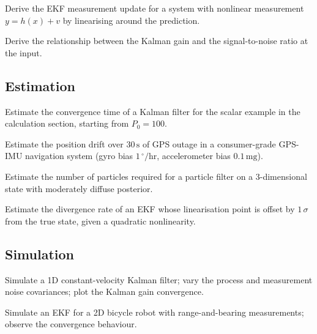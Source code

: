 \begin{exercise}
Derive the EKF measurement update for a system with nonlinear measurement $y = h(x) + v$ by linearising around the prediction.
\end{exercise}

\begin{exercise}
Derive the relationship between the Kalman gain and the signal-to-noise ratio at the input.
\end{exercise}

\subsection*{Estimation}

\begin{exercise}
Estimate the convergence time of a Kalman filter for the scalar example in the calculation section, starting from $P_0 = 100$.
\end{exercise}

\begin{exercise}
Estimate the position drift over $30\,\text{s}$ of GPS outage in a consumer-grade GPS-IMU navigation system (gyro bias $1\,^\circ/\text{hr}$, accelerometer bias $0.1\,\text{mg}$).
\end{exercise}

\begin{exercise}
Estimate the number of particles required for a particle filter on a $3$-dimensional state with moderately diffuse posterior.
\end{exercise}

\begin{exercise}
Estimate the divergence rate of an EKF whose linearisation point is offset by $1\,\sigma$ from the true state, given a quadratic nonlinearity.
\end{exercise}

\subsection*{Simulation}

\begin{exercise}
Simulate a 1D constant-velocity Kalman filter; vary the process and measurement noise covariances; plot the Kalman gain convergence.
\end{exercise}

\begin{exercise}
Simulate an EKF for a 2D bicycle robot with range-and-bearing measurements; observe the convergence behaviour.
\end{exercise}

